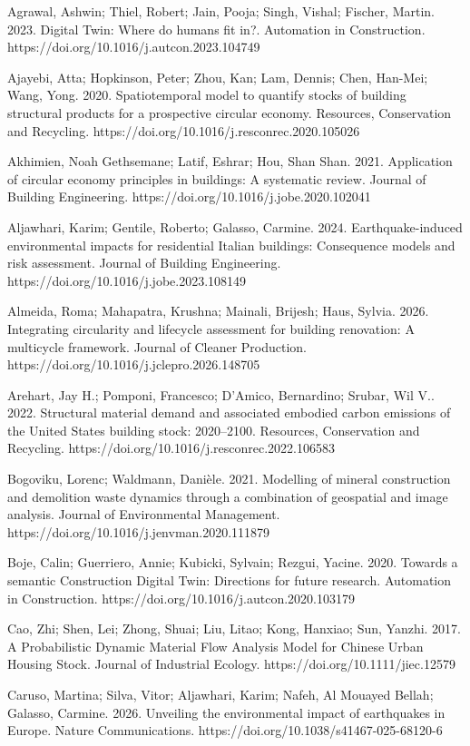 Agrawal, Ashwin; Thiel, Robert; Jain, Pooja; Singh, Vishal; Fischer, Martin. 2023. Digital Twin: Where do humans fit in?. Automation in Construction. https://doi.org/10.1016/j.autcon.2023.104749

Ajayebi, Atta; Hopkinson, Peter; Zhou, Kan; Lam, Dennis; Chen, Han-Mei; Wang, Yong. 2020. Spatiotemporal model to quantify stocks of building structural products for a prospective circular economy. Resources, Conservation and Recycling. https://doi.org/10.1016/j.resconrec.2020.105026

Akhimien, Noah Gethsemane; Latif, Eshrar; Hou, Shan Shan. 2021. Application of circular economy principles in buildings: A systematic review. Journal of Building Engineering. https://doi.org/10.1016/j.jobe.2020.102041

Aljawhari, Karim; Gentile, Roberto; Galasso, Carmine. 2024. Earthquake-induced environmental impacts for residential Italian buildings: Consequence models and risk assessment. Journal of Building Engineering. https://doi.org/10.1016/j.jobe.2023.108149

Almeida, Roma; Mahapatra, Krushna; Mainali, Brijesh; Haus, Sylvia. 2026. Integrating circularity and lifecycle assessment for building renovation: A multicycle framework. Journal of Cleaner Production. https://doi.org/10.1016/j.jclepro.2026.148705

Arehart, Jay H.; Pomponi, Francesco; D'Amico, Bernardino; Srubar, Wil V.. 2022. Structural material demand and associated embodied carbon emissions of the United States building stock: 2020--2100. Resources, Conservation and Recycling. https://doi.org/10.1016/j.resconrec.2022.106583

Bogoviku, Lorenc; Waldmann, Danièle. 2021. Modelling of mineral construction and demolition waste dynamics through a combination of geospatial and image analysis. Journal of Environmental Management. https://doi.org/10.1016/j.jenvman.2020.111879

Boje, Calin; Guerriero, Annie; Kubicki, Sylvain; Rezgui, Yacine. 2020. Towards a semantic Construction Digital Twin: Directions for future research. Automation in Construction. https://doi.org/10.1016/j.autcon.2020.103179

Cao, Zhi; Shen, Lei; Zhong, Shuai; Liu, Litao; Kong, Hanxiao; Sun, Yanzhi. 2017. A Probabilistic Dynamic Material Flow Analysis Model for Chinese Urban Housing Stock. Journal of Industrial Ecology. https://doi.org/10.1111/jiec.12579

Caruso, Martina; Silva, Vitor; Aljawhari, Karim; Nafeh, Al Mouayed Bellah; Galasso, Carmine. 2026. Unveiling the environmental impact of earthquakes in Europe. Nature Communications. https://doi.org/10.1038/s41467-025-68120-6

